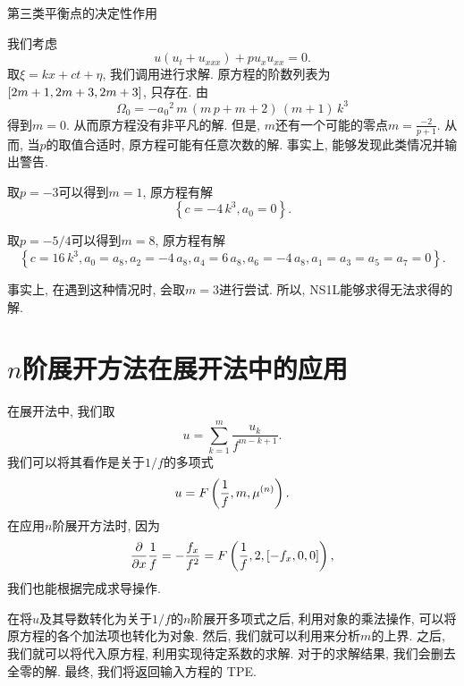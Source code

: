 \begin{example} 第三类平衡点的决定性作用 

我们考虑
\begin{equation}
    u(u_t+u_{xxx})+pu_x u_{xx}=0.
\end{equation}
取$\xi=kx+ct+\eta$, 我们调用进行求解. 原方程的阶数列表为$\left[2m+1,2m+3,2m+3\right]$, 只存在\BPthree{}. 由
\begin{equation}
    \Omega_0=-{{{a}_{0}}}^{2}\,m\,\left( m\,p+m+2\right) \,\left( m+1\right) \,{k}^{3}
\end{equation}
得到$m=0$. 从而原方程没有非平凡的解. 但是, $m$还有一个可能的零点$m=\frac{-2}{p+1}$. 从而, 当$p$的取值合适时, 原方程可能有任意次数的解. 事实上, 能够发现此类情况并输出警告. 

取$p=-3$可以得到$m=1$, 原方程有解 
\begin{equation}
    \left\{ c=-4\,{k}^{3},{{a}_{0}}=0\right\} .
\end{equation}

取$p=-5/4$可以得到$m=8$, 原方程有解 
\begin{equation}
    \left\{ c=16\,{k}^{3},{{a}_{0}}={{a}_{8}},{{a}_{2}}=-4\,{{a}_{8}},{{a}_{4}}=6\,{{a}_{8}},{{a}_{6}}=-4\,{{a}_{8}},a_1=a_3=a_5=a_7=0\right\} .
\end{equation}

事实上, 在遇到这种情况时, 会取$m=3$进行尝试. 所以, NS1L能够求得无法求得的解. 
\end{example}

\section{$n$阶展开方法在\Painleve{}展开法中的应用}\label{ch4sec6}
在\Painleve{}展开法中, 我们取
\begin{equation}
    u=\sum_{k=1}^{m}\frac{u_k}{f^{m-k+1}}. \label{TPE-pkg}
\end{equation}
我们可以将其看作是关于$1/f$的多项式
\begin{equation}
    u=F\left(\frac{1}{f},m,\mu^{(n)}\right).
\end{equation}
在应用$n$阶展开方法时, 因为 
\begin{equation}
    \frac{\partial}{\partial x}{\frac{1}{f}}=-\frac{f_x}{f^2}=F\left(\frac{1}{f},2,\left[-f_x,0,0\right]\right),
\end{equation}
我们也能根据完成求导操作. 

在将$u$及其导数转化为关于$1/f$的$n$阶展开多项式之后, 利用对象的乘法操作, 可以将原方程的各个加法项也转化为对象. 然后, 我们就可以利用来分析$m$的上界. 之后, 我们就可以将代入原方程, 利用实现待定系数的求解. 对于的求解结果, 我们会删去全零的解. 最终, 我们将返回输入方程的 TPE. 

